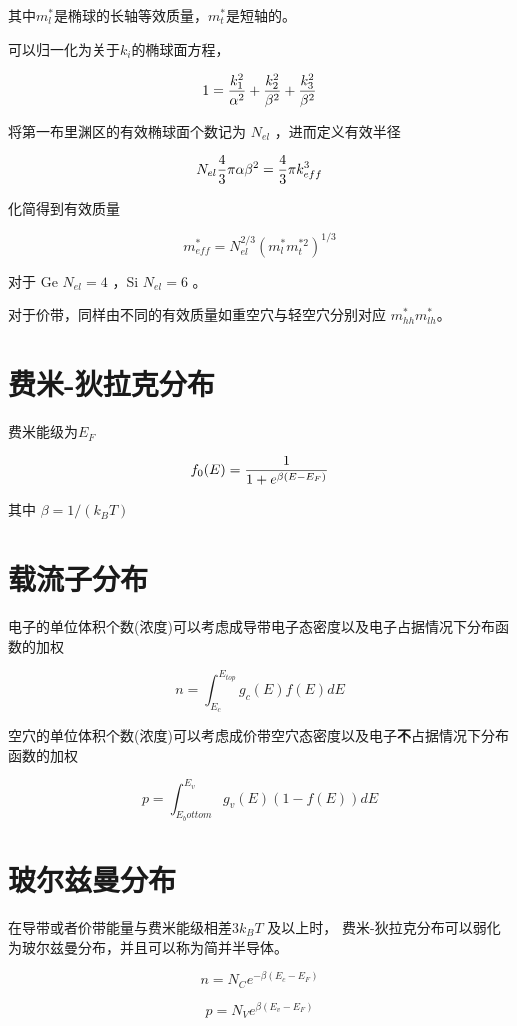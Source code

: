 \documentclass[cn,11pt,chinese,black,simple]{../elegantbook}
\begin{document}
其中\(m_l^*\)是椭球的长轴等效质量，\(m_t^*\)是短轴的。

可以归一化为关于\(k_i\)的椭球面方程，

\[1 = \displaystyle\frac{k_1^2}{\alpha^2} + \displaystyle\frac{k_2^2}{\beta^2} + \displaystyle\frac{k_3^2}{\beta^2}\]

将第一布里渊区的有效椭球面个数记为 \(N_{el}\) ，进而定义有效半径

\[N_{el} \displaystyle\frac{4}{3} \pi \alpha\beta^2 = \displaystyle\frac{4}{3} \pi k_{eff}^3\]

化简得到有效质量

\[m_{eff}^* = N_{el}^{2/3}  (m_l^* m_t^{*2})^{1/3}\]

对于 Ge \(N_{el} = 4\) ，Si \(N_{el} = 6\) 。

对于价带，同样由不同的有效质量如重空穴与轻空穴分别对应 \(m^*_{hh} m^*_{lh}\)。





\section{费米-狄拉克分布}

费米能级为\(E_F\)

\[f_0(E) = \displaystyle\frac{1}{1+e^{\beta (E- E_F)}}\]

其中 \(\beta = 1 / (k_B T)\)

\section{载流子分布}

电子的单位体积个数(浓度)可以考虑成导带电子态密度以及电子占据情况下分布函数的加权

\[n = \int_{E_c}^{E_{top}} g_c(E) f(E) dE\]

空穴的单位体积个数(浓度)可以考虑成价带空穴态密度以及电子\textbf{不}占据情况下分布函数的加权

\[p = \int_{E_bottom}^{E_{v}} g_v(E) (1 - f(E)) dE\]



\section{玻尔兹曼分布}

在导带或者价带能量与费米能级相差\(3 k_B T\) 及以上时， 费米-狄拉克分布可以弱化为玻尔兹曼分布，并且可以称为简并半导体。

\[n = N_C  e^{-\beta(E_c - E_F)}\]


\[p = N_V  e^{\beta (E_v - E_F)}\]
\end{document}
